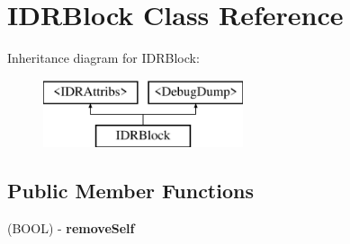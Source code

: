 \hypertarget{interface_i_d_r_block}{
\section{IDRBlock Class Reference}
\label{interface_i_d_r_block}
}
Inheritance diagram for IDRBlock:\begin{figure}[H]
\begin{center}
\leavevmode
\includegraphics[height=2.000000cm]{interface_i_d_r_block}
\end{center}
\end{figure}
\subsection*{Public Member Functions}
\begin{DoxyCompactItemize}
\item 
\hypertarget{interface_i_d_r_block_abda20ac04af2392ab1f850a2e0eb5cce}{
(BOOL) -\/ {\bfseries removeSelf}}
\label{interface_i_d_r_block_abda20ac04af2392ab1f850a2e0eb5cce}

\end{DoxyCompactItemize}

